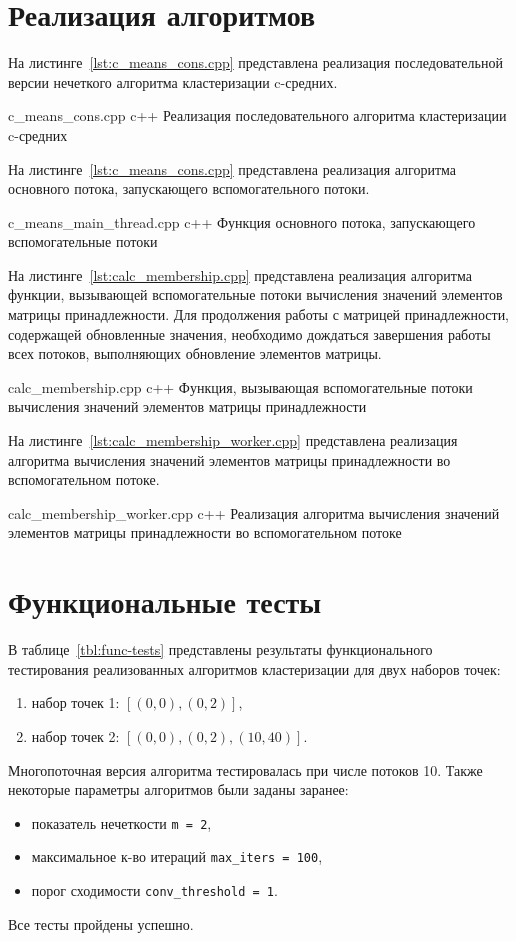 \section{Реализация алгоритмов}

На листинге~\ref{lst:c_means_cons.cpp} представлена реализация последовательной версии нечеткого алгоритма кластеризации c-средних.

	{c_means_cons.cpp}
	{c++}
	{Реализация последовательного алгоритма кластеризации c-средних}
	
На листинге~\ref{lst:c_means_cons.cpp} представлена реализация алгоритма основного потока, запускающего вспомогательного потоки.

	{c_means_main_thread.cpp}
	{c++}
	{Функция основного потока, запускающего вспомогательные потоки}
	
На листинге~\ref{lst:calc_membership.cpp} представлена реализация алгоритма функции, вызывающей вспомогательные потоки вычисления значений элементов матрицы принадлежности.
Для продолжения работы с матрицей принадлежности, содержащей обновленные значения, необходимо дождаться завершения работы всех потоков, выполняющих обновление элементов матрицы.

	{calc_membership.cpp}
	{c++}
	{Функция, вызывающая вспомогательные потоки вычисления значений элементов матрицы принадлежности}

На листинге~\ref{lst:calc_membership_worker.cpp} представлена реализация алгоритма вычисления значений элементов матрицы принадлежности во вспомогательном потоке.

	{calc_membership_worker.cpp}
	{c++}
	{Реализация алгоритма вычисления значений элементов матрицы принадлежности во вспомогательном потоке}

\section{Функциональные тесты}

В таблице~\ref{tbl:func-tests} представлены результаты функционального тестирования реализованных алгоритмов кластеризации для двух наборов точек:
\begin{enumerate}
	\item набор точек 1: $[(0, 0), (0, 2)]$,
	\item набор точек 2: $[(0, 0), (0, 2), (10, 40)]$.
\end{enumerate}
Многопоточная версия алгоритма тестировалась при числе потоков 10.
Также некоторые параметры алгоритмов были заданы заранее:
\begin{itemize}
	\item показатель нечеткости \texttt{m = 2},
	\item максимальное к-во итераций \texttt{max\_iters = 100},
	\item порог сходимости \texttt{conv\_threshold = 1}.
\end{itemize}
Все тесты пройдены успешно.

